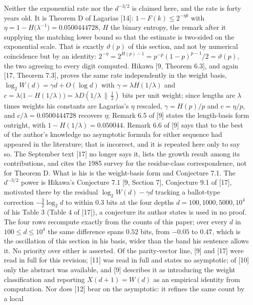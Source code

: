 \documentclass[11pt,a4paper]{article}
\begin{document}
Neither the exponential rate nor the \(d^{-3/2}\) is claimed here, and
the rate is forty years old. It is Theorem D of Lagarias {[}14{]}:
\(1-F(k)\le2^{-\eta k}\) with
\(\eta=1-H\bigl(\lambda^{-1}\bigr)=0.0500444728\), \(H\) the binary
entropy, the remark after it supplying the matching lower bound so that
the estimate is two-sided on the exponential scale. That is exactly
\(\vartheta(p)\) of this section, and not by numerical coincidence but
by an identity: \(2^{-\eta}=2^{H(p)-1}=p^{-p}(1-p)^{p-1}/2
=\vartheta(p)\), the two agreeing to every digit computed. Hikawa {[}9,
Theorem 6.3{]}, and again {[}17, Theorem 7.3{]}, proves the same rate
independently in the weight basis, \(\log_2W(d)=\gamma d+O(\log d)\)
with \(\gamma=\lambda H(1/\lambda)\) and
\(c=\lambda\bigl(1-H(1/\lambda)\bigr)=\lambda D(1/\lambda\,\|\,\tfrac12)\)
bits per unit weight; since lengths are \(\lambda\) times weights his
constants are Lagarias's \(\eta\) rescaled, \(\gamma=H(p)/p\) and
\(c=\eta/p\), and \(c/\lambda=0.0500444728\) recovers \(\eta\); Remark
6.5 of {[}9{]} states the length-basis form outright, with
\(1-H(1/\lambda)=0.050044\). Remark 6.6 of {[}9{]} says that to the best
of the author's knowledge no asymptotic formula for either sequence had
appeared in the literature; that is incorrect, and it is repeated here
only to say so. The September text {[}17{]} no longer says it, lists the
growth result among its contributions, and cites the 1985 survey for the
residue-class correspondence, not for Theorem D. What is his is the
weight-basis form and Conjecture 7.1. The \(d^{-3/2}\) power is Hikawa's
Conjecture 7.1 {[}9, Section 7{]}, Conjecture 9.1 of {[}17{]}, motivated
there by the residual \(\log_2W(d)-\gamma d\) tracking a ballot-type
correction \(-\tfrac32\log_2d\) to within \(0.3\) bits at the four
depths \(d=100,1000,5000,10^4\) of his Table 3 (Table 4 of {[}17{]}), a
conjecture its author states is used in no proof. The four rows
recompute exactly from the counts of this paper; over every \(d\) in
\(100\le d\le10^4\) the same difference spans \(0.52\) bits, from
\(-0.05\) to \(0.47\), which is the oscillation of this section in his
basis, wider than the band his sentence allows it. No priority over
either is asserted. Of the parity-vector line, {[}9{]} and {[}17{]} were
read in full for this revision; {[}11{]} was read in full and states no
asymptotic; of {[}10{]} only the abstract was available, and {[}9{]}
describes it as introducing the weight classification and reporting
\(X(d+1)=W(d)\) as an empirical identity from computation. Nor does
{[}12{]} bear on the asymptotic: it refines the same count by a local
\end{document}
